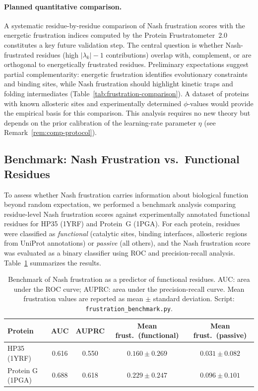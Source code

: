 \documentclass[12pt,a4paper]{article}
\theoremstyle{remark}
\begin{document}
\paragraph{Planned quantitative comparison.}
A systematic residue-by-residue comparison of Nash frustration scores with the energetic frustration indices computed by the Protein Frustratometer~2.0 \cite{ParraFerreiro2016} constitutes a key future validation step. The central question is whether Nash-frustrated residues (high $|\lambda_k|-1$ contributions) overlap with, complement, or are orthogonal to energetically frustrated residues. Preliminary expectations suggest partial complementarity: energetic frustration identifies evolutionary constraints and binding sites, while Nash frustration should highlight kinetic traps and folding intermediates (Table~\ref{tab:frustration-comparison}). A dataset of proteins with known allosteric sites and experimentally determined $\phi$-values would provide the empirical basis for this comparison. This analysis requires no new theory but depends on the prior calibration of the learning-rate parameter $\eta$ (see Remark~\ref{rem:comp-protocol}).

\subsection{Benchmark: Nash Frustration vs.\ Functional Residues}
\label{sec:frustration-benchmark}

To assess whether Nash frustration carries information about biological function beyond random expectation, we performed a benchmark analysis comparing residue-level Nash frustration scores against experimentally annotated functional residues for HP35 (1YRF) and Protein~G (1PGA). For each protein, residues were classified as \emph{functional} (catalytic sites, binding interfaces, allosteric regions from UniProt annotations) or \emph{passive} (all others), and the Nash frustration score was evaluated as a binary classifier using ROC and precision-recall analysis. Table~\ref{tab:frustration-benchmark} summarizes the results.

\begin{table}[ht]
\centering
\caption{Benchmark of Nash frustration as a predictor of functional residues. AUC: area under the ROC curve; AUPRC: area under the precision-recall curve. Mean frustration values are reported as mean $\pm$ standard deviation. Script: \texttt{frustration\_benchmark.py}.}
\label{tab:frustration-benchmark}
\begin{tabular}{lcccc}
\toprule
\textbf{Protein} & \textbf{AUC} & \textbf{AUPRC} & \textbf{Mean frust.\ (functional)} & \textbf{Mean frust.\ (passive)} \\
\midrule
HP35 (1YRF) & 0.616 & 0.550 & $0.160 \pm 0.269$ & $0.031 \pm 0.082$ \\
Protein G (1PGA) & 0.688 & 0.618 & $0.229 \pm 0.247$ & $0.096 \pm 0.101$ \\
\bottomrule
\end{tabular}
\end{table}
\end{document}
